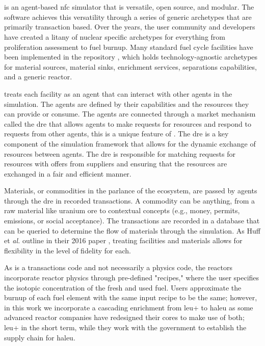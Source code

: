 \section{\cyclus}
\label{sec:cyclus}
\cyclus is an agent-based \gls{nfc} simulator that is versatile, open source, and modular. The software achieves this versatility through a series of generic archetypes that are primarily transaction based. Over the years, the user community and developers have created a litany of nuclear specific archetypes for everything from proliferation assessment to fuel burnup. Many standard fuel cycle facilities have been implemented in the \cycamore repository \cite{Carlsen_cycamore_2014}, which holds technology-agnostic archetypes for material sources, material sinks, enrichment services, separations capabilities, and a generic reactor.

\cyclus treats each facility as an agent that can interact with other agents in the simulation. The agents are defined by their capabilities and the resources they can provide or consume. The agents are connected through a market mechanism called the \gls{dre} that allows agents to make requests for resources and respond to requests from other agents, this is a unique feature of \cyclus. The \gls{dre} is a key component of the \cyclus simulation framework that allows for the dynamic exchange of resources between agents. The \gls{dre} is responsible for matching requests for resources with offers from suppliers and ensuring that the resources are exchanged in a fair and efficient manner.

Materials, or commodities in the parlance of the \cyclus ecosystem, are passed by agents through the \gls{dre} in recorded transactions. A commodity can be anything, from a raw material like uranium ore to contextual concepts (e.g., money, permits, emissions, or social acceptance). The transactions are recorded in a database that can be queried to determine the flow of materials through the simulation. As Huff et \textit{al.} outline in their 2016 paper \cite{huff_cyclus_intro_2016}, treating facilities and materials allows for flexibility in the level of fidelity for each.

As \cyclus is a transactions code and not necessarily a physics code,
the reactors incorporate reactor physics through pre-defined "recipes,"
where the user specifies the isotopic concentration of the fresh and
used fuel. Users approximate the burnup of each fuel element with the
same input recipe to be the same; however, in this work we incorporate a
cascading enrichment from \gls{leu+} to \gls{haleu} as some advanced reactor companies have redesigned their cores to make use of both; \gls{leu+} in the short term, while they work with the government to establish the supply chain for \gls{haleu}.

